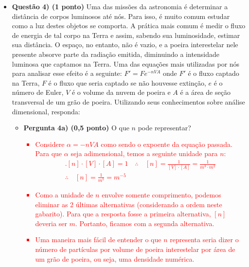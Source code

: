 \documentclass[a4paper, 12pt]{article}
\newcommand{\red}[1]{\textcolor{red}{#1}}
\begin{document}
\begin{flushleft}
\begin{itemize}
            \item \textbf{Questão 4) (1 ponto)} Uma das missões da astronomia é determinar a distância de corpos luminosos até nós. Para isso, é muito comum estudar como a luz destes objetos se comporta. A prática mais comum é medir o fluxo de energia de tal corpo na Terra e assim, sabendo sua luminosidade, estimar sua distância. O espaço, no entanto, não é vazio, e a poeira interestelar nele presente absorve parte da radiação emitida, diminuindo a intensidade luminosa que captamos na Terra. Uma das equações mais utilizadas por nós para analisar esse efeito é a seguinte: $F'=F e^{-nVA}$ onde $F'$ é o fluxo captado na Terra, $F$ é o fluxo que seria captado se não houvesse extinção, $e$ é o número de Euler, $V$ é o volume da nuvem de poeira e $A$ é a área de seção transversal de um grão de poeira. Utilizando seus conhecimentos sobre análise dimensional, responda:
                \begin{itemize}
                    \item \textbf{Pergunta 4a) (0,5 ponto)} O que $n$ pode representar?
                        \red{\begin{itemize}
                            \item Considere $\alpha=-nVA$ como sendo o expoente da equação passada. Para que $\alpha$ seja adimensional, temos a seguinte unidade para $n$:
                                \begin{equation*} \begin{gathered}
                                    .[n] \cdot [V] \cdot [A] = 1 \quad \therefore \quad [n]=\frac{1}{[V] \cdot [A]}=\frac{1}{m^3 \cdot m^2} \\
                                    \therefore \quad [n] = \frac{1}{m^5} = m^{-5}
                                \end{gathered} \end{equation*}
                            \item Como a unidade de $n$ envolve somente comprimento, podemos eliminar as 2 últimas alternativas (considerando a ordem neste gabarito). Para que a resposta fosse a primeira alternativa, $[n]$ deveria ser $m$. Portanto, ficamos com a segunda alternativa.
                            \item Uma maneira mais fácil de entender o que $n$ representa seria dizer o número de partículas por volume de poeira interestelar por área de um grão de poeira, ou seja, uma densidade numérica.
                        \end{itemize}}

\end{itemize}
\end{itemize}
\end{flushleft}
\end{document}
